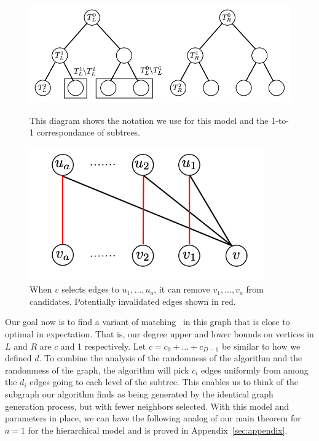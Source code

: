 \begin{figure}[b]
\centering
\begin{minipage}{0.45\textwidth}
\centering
\includegraphics[width=1.1\textwidth]{images/hierarchy_tree.png}
\caption{This diagram shows the notation we use for this model and the 1-to-1 correspondance of subtrees.}\label{fig:hierarchy}
\end{minipage}
\hspace{0cm}
\begin{minipage}{0.45\textwidth}
\centering
\includegraphics[width=0.9\textwidth]{images/greedy.png}


\caption{When $v$ selects edges to $u_1,\ldots, u_a$, it can remove $v_1,\ldots, v_a$ from candidates. Potentially invalidated edges shown in red.}


\end{minipage}
\end{figure}




Our goal now is to find a variant of matching~\cite{Gabow1983} in this
graph that is close to optimal in expectation. That is, our degree
upper and lower bounds on vertices in $L$ and $R$ are $c$ and 1
respectively. Let $c = c_0 + \ldots + c_{D-1}$ be similar to how we
defined $d$.  To combine the analysis of the randomness of the
algorithm and the randomness of the graph, the algorithm will pick
$c_{i}$ edges uniformly from among the $d_{i}$ edges going to each
level of the subtree. This enables us to think of the subgraph our
algorithm finds as being generated by the identical graph generation
process, but with fewer neighbors selected. With this model and
parameters in place, we can have the following analog of our main
theorem for $a=1$ for the hierarchical model and is proved in Appendix~\ref{sec:appendix}.

